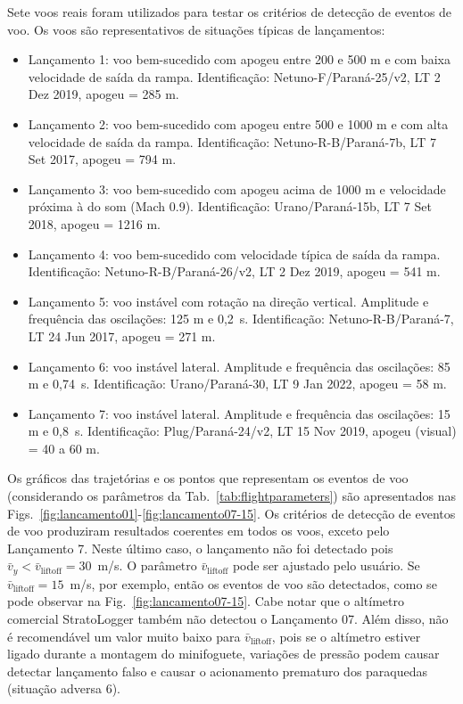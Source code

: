 \documentclass[12pt,a4paper]{article}
\begin{document}
Sete voos reais foram utilizados para testar os critérios de detecção de eventos de voo. Os voos são representativos de situações típicas de lançamentos:
\begin{itemize}
	\item Lançamento 1: voo bem-sucedido com apogeu entre 200 e 500 m e com baixa velocidade de saída da rampa. Identificação: Netuno-F/Paraná-25/v2, LT 2 Dez 2019, apogeu = 285 m.
	
	\item Lançamento 2: voo bem-sucedido com apogeu entre 500 e 1000 m e com alta velocidade de saída da rampa. Identificação: Netuno-R-B/Paraná-7b, LT 7 Set 2017, apogeu = 794 m.
	
	\item Lançamento 3: voo bem-sucedido com apogeu acima de 1000 m e velocidade próxima à do som (Mach 0.9). Identificação: Urano/Paraná-15b, LT 7 Set 2018, apogeu = 1216 m.
	
	\item Lançamento 4: voo bem-sucedido com velocidade típica de saída da rampa. Identificação: Netuno-R-B/Paraná-26/v2, LT 2 Dez 2019, apogeu = 541 m.
	
	\item Lançamento 5: voo instável com rotação na direção vertical. Amplitude e frequência das oscilações: 125 m e 0,2~s. Identificação: Netuno-R-B/Paraná-7, LT 24 Jun 2017, apogeu = 271 m.
	
	\item Lançamento 6: voo instável lateral. Amplitude e frequência das oscilações: 85 m e 0,74~s. Identificação: 
	Urano/Paraná-30, LT 9 Jan 2022, apogeu = 58 m.
	
	\item Lançamento 7: voo instável lateral.  Amplitude e frequência das oscilações: 15 m e 0,8~s. Identificação:
	Plug/Paraná-24/v2, LT 15 Nov 2019, apogeu (visual) = 40 a 60 m.
\end{itemize}

Os gráficos das trajetórias e os pontos que representam os eventos de voo (considerando os parâmetros da Tab.~\ref{tab:flightparameters}) são apresentados nas Figs.~\ref{fig:lancamento01}-\ref{fig:lancamento07-15}. Os critérios de detecção de eventos de voo produziram resultados coerentes em todos os voos, exceto pelo Lançamento 7. Neste último caso, o lançamento não foi detectado pois $\bar{v}_y<\bar{v}_\text{liftoff}=30$~m/s. O parâmetro $\bar{v}_\text{liftoff}$ pode ser ajustado pelo usuário. Se $\bar{v}_\text{liftoff}=15$~m/s, por exemplo, então os eventos de voo são detectados, como se pode observar na Fig.~\ref{fig:lancamento07-15}. Cabe notar que o altímetro comercial StratoLogger também não detectou o Lançamento 07. Além disso, não é recomendável um valor muito baixo para $\bar{v}_\text{liftoff}$, pois se o altímetro estiver ligado durante a montagem do minifoguete, variações de pressão podem causar detectar lançamento falso e causar o acionamento prematuro dos paraquedas (situação adversa 6).
\end{document}
